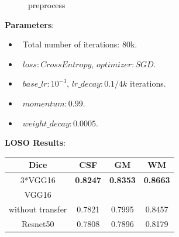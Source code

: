 \documentclass{article}
\begin{document}
\begin{spacing}{1.4}
\begin{figure}[H]
    \caption{preprocess}
    \label{fig:preprocess}
\end{figure}

\textbf{Parameters}:
\begin{itemize}
    \item ~Total number of iterations: 80k. 
    \item ~$\mathit{loss} : CrossEntropy$, $\mathit{optimizer} : SGD$.
    \item ~$\mathit{base\_lr} : 10^{-3}$, $\mathit{lr\_decay} : 0.1/4k$ iterations. 
    \item ~$\mathit{momentum} : 0.99$.
    \item ~$\mathit{weight\_decay} : 0.0005$. 
\end{itemize}

\textbf{LOSO Results}:

\begin{center}
\begin{tabular}{|c|c|c|c|}
    \hline
    {\bf Dice} & {\bf CSF} & {\bf GM} & {\bf WM}\\
    \hline
    {3*VGG16}          & \color{red}\bf{0.8247} & \color{red}\bf{0.8353} & \color{red}\bf{0.8663}\\
    {VGG16}            & \color{blue}{0.8053} & \color{blue}{0.8203} & \color{blue}{0.8628} \\
    {without transfer} & 0.7821 & 0.7995 & 0.8457 \\
    {Resnet50}         & 0.7808 & 0.7896 & 0.8179 \\
    \hline
\end{tabular}
\end{center}




\end{spacing}
\end{document}
